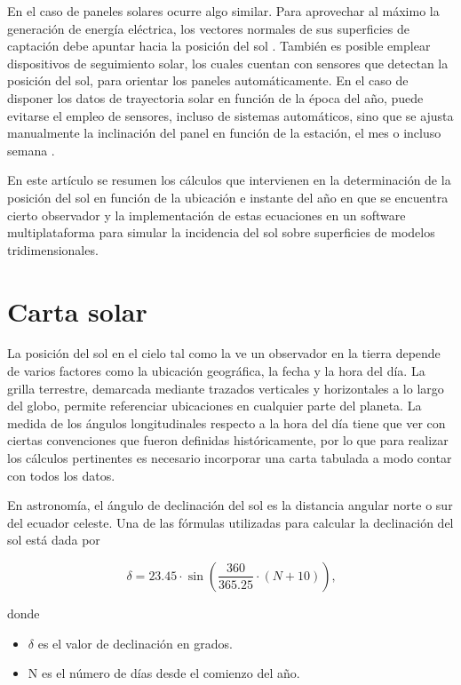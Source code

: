\documentclass[a4paper]{article}
\begin{document}
En el caso de paneles solares ocurre algo similar. Para aprovechar al máximo la generación de energía eléctrica, los vectores normales de sus superficies de captación debe apuntar hacia la posición del sol \cite{zalamea2023}. También es posible emplear dispositivos de seguimiento solar, los cuales cuentan con sensores que detectan la posición del sol, para orientar los paneles automáticamente. En el caso de disponer los datos de trayectoria solar en función de la época del año, puede evitarse el empleo de sensores, incluso de sistemas automáticos, sino que se ajusta manualmente la inclinación del panel en función de la estación, el mes o incluso semana \cite{ou2014}.

En este artículo se resumen los cálculos que intervienen en la determinación de la posición del sol en función de la ubicación e instante del año en que se encuentra cierto observador y la implementación de estas ecuaciones en un software multiplataforma para simular la incidencia del sol sobre superficies de modelos tridimensionales.

\section{Carta solar}

La posición del sol en el cielo tal como la ve un observador en la tierra depende de varios factores como la ubicación geográfica, la fecha y la hora del día. La grilla terrestre, demarcada mediante trazados verticales y horizontales a lo largo del globo, permite referenciar ubicaciones en cualquier parte del planeta. La medida de los ángulos longitudinales respecto a la hora del día tiene que ver con ciertas convenciones que fueron definidas históricamente, por lo que para realizar los cálculos pertinentes es necesario incorporar una carta tabulada a modo contar con todos los datos.

En astronomía, el ángulo de declinación del sol es la distancia angular norte o sur del ecuador celeste. Una de las fórmulas utilizadas para calcular la declinación del sol está dada por

\begin{equation}\label{eq:declinacion}
    \delta = 23.45 \cdot \sin \left(\frac{360}{365.25}\cdot \left(N+10\right)  \right)\text{,}
\end{equation}

donde 
\begin{itemize}
    \item $\delta$ es el valor de declinación en grados.
    \item N es el número de días desde el comienzo del año.
\end{itemize}
\end{document}
